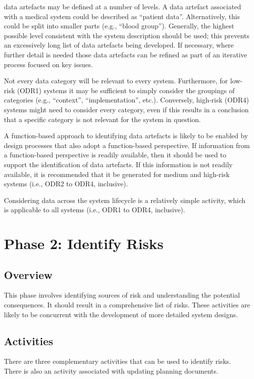\Glspl{data artefact} may be defined at a number of levels. A \gls{data artefact} associated with a medical system could be described as ``patient data''. Alternatively, this could be split into smaller parts (e.g., ``blood group''). Generally, the highest possible level consistent with the system description should be used; this prevents an excessively long list of \glspl{data artefact} being developed. If necessary, where further detail is needed those \glspl{data artefact} can be refined as part of an iterative process focused on key issues.

Not every data category will be relevant to every system. Furthermore, for low-risk (ODR1) systems it may be sufficient to simply consider the groupings of categories (e.g., ``context'', ``implementation'', etc.). Conversely, high-risk (ODR4) systems might need to consider every category, even if this results in a conclusion that a specific category is not relevant for the system in question.

A function-based approach to identifying \glspl{data artefact} is likely to be enabled by design processes that also adopt a function-based perspective. If \gls{information} from a function-based perspective is readily available, then it should be used to support the identification of \glspl{data artefact}. If this \gls{information} is not readily available, it is recommended that it be generated for medium and high-risk systems (i.e., ODR2 to ODR4, inclusive).

Considering data across the system lifecycle is a relatively simple activity, which is applicable to all systems (i.e., ODR1 to ODR4, inclusive).

\clearpage
\section{Phase 2: Identify Risks}
\subsection{Overview}
This phase involves identifying sources of risk and understanding the potential consequences. It should result in a comprehensive list of risks. These activities are likely to be concurrent with the development of more detailed system designs.

\subsection{Activities}
There are three complementary activities that can be used to identify risks. There is also an activity associated with updating planning documents.

